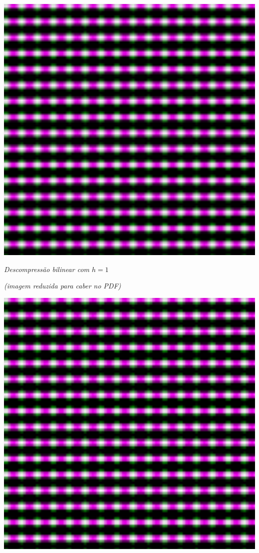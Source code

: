 \documentclass{article}
\begin{document}
\begin{center}
\bigskip
\includegraphics[scale=.45]{bih1.png}

\emph{Descompressão bilinear com $h = 1$}

\emph{(imagem reduzida para caber no PDF)}

\bigskip
\includegraphics[scale=.45]{cubi01.png}


\end{center}
\end{document}

